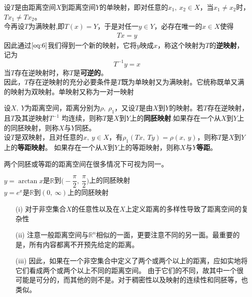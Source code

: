 \begin{newdef}
    设$T$是由距离空间$X$到距离空间$Y$的单映射，即对任意的$x_1,\ x_2 \in X$，当$x_1 \neq x_2$时，$Tx_1 \neq Tx_2$。\\
    今再设$T$为满映射,即$T(x)=Y$，于是对任一$y \in Y$，必存在唯一的$x \in X$使得
    \begin{align}
        Tx=y
        \label{eq:6}
    \end{align}
    因此通过$\eqref{eq:6}$我们得到一个新的映射，它将$y$映成$x$，称这个映射为$T$的\textbf{逆映射}，记为$$T^{-1}y=x$$
    当$T$存在逆映射时，称$T$是\textbf{可逆的}。\\
    因此，$T$存在逆映射的充分必要条件是$T$既为单映射又为满映射。它统称既单又满的映射为双映射。单映射又称为一对一映射
\end{newdef}
\begin{newdef}
    设$X,\ Y$为距离空间，距离分别为$\rho ,\ \rho_1$，又设$T$是由$X$到$Y$的映射。若$T$存在逆映射，且$T$及其逆映射$T^{-1}$
    均连续，则称$T$是$X$到$Y$上的\textbf{同胚映射}.如果存在一个从$X$到$Y$上的同胚映射，则称$X$与$Y$同胚。\\
    设$T$是双映射，且对任意的$x,\ y \in X$，有$\rho_1(Tx, \ Ty)=\rho(x,\ y)$，则称$T$是$X$到$Y$上的\textbf{等距映射}。
    如果存在一个从$X$到$Y$上的等距映射，则称$X$与$Y$\textbf{等距}。
\end{newdef}
\begin{note}
    两个同胚或等距的距离空间在很多情况下可视为同一。
\end{note}
\begin{newex}
    $y=\arctan x$是$\mathbb R$到$\big( -\dfrac{\pi}{2} , \ \dfrac{\pi}{2}\big)$上的同胚映射 \\
    $y=e^x$是$\mathbb R$到$(0,\ \infty)$上的同胚映射
\end{newex}
\begin{note}
    \begin{itemize}
        \item [(i)] 对于非空集合$X$的任意性以及在$X$上定义距离的多样性导致了距离空间的复杂性
        \item [(ii)] 注意一般距离空间与$\mathbb R^n$相似的一面，更要注意不同的另一面。最重要的是，所有内容都离不开预先给定的距离。
        \item [(iii)] 因此，如果在一个非空集合中定义了两个或两个以上的距离，应如实地将它们看成两个或两个以上不同的距离空间。
        由于它们的不同，故其中一个很可能是可分的，而其他的则不是。对于稠密性以及映射的连续性和同胚等，也类似。
    \end{itemize}    
\end{note}